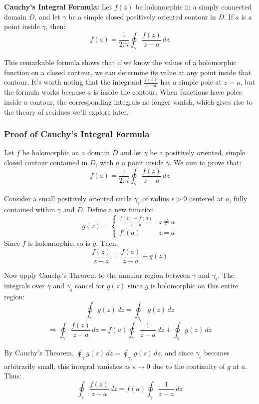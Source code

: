 \noindent \textbf{Cauchy's Integral Formula:} Let $f(z)$ be holomorphic in a simply connected domain $D$, and let $\gamma$ be a simple closed positively oriented contour in $D$. If $a$ is a point inside $\gamma$, then:
\[
f(a) = \frac{1}{2\pi i} \oint_{\gamma} \frac{f(z)}{z-a} \, dz
\]

\noindent This remarkable formula shows that if we know the values of a holomorphic function on a closed contour, we can determine its value at any point inside that contour. It's worth noting that the integrand $\frac{f(z)}{z-a}$ has a simple pole at $z = a$, but the formula works because $a$ is inside the contour. When functions have poles inside a contour, the corresponding integrals no longer vanish, which gives rise to the theory of residues we'll explore later.

\subsubsection*{Proof of Cauchy's Integral Formula}

\noindent Let \( f \) be holomorphic on a domain \( D \) and let \( \gamma \) be a positively oriented, simple closed contour contained in \( D \), with \( a \) a point inside \( \gamma \). We aim to prove that:
\[
f(a) = \frac{1}{2\pi i} \oint_\gamma \frac{f(z)}{z - a} \, dz
\]

\noindent Consider a small positively oriented circle \( \gamma_\epsilon \) of radius \( \epsilon > 0 \) centered at \( a \), fully contained within \( \gamma \) and \( D \). Define a new function
\[
g(z) = 
\begin{cases}
\frac{f(z) - f(a)}{z - a} & z \ne a \\
f'(a) & z = a
\end{cases}
\]
Since \( f \) is holomorphic, so is \( g \). Then,
\[
\frac{f(z)}{z - a} = \frac{f(a)}{z - a} + g(z)
\]

\noindent Now apply Cauchy's Theorem to the annular region between \( \gamma \) and \( \gamma_\epsilon \). The integrals over \( \gamma \) and \( \gamma_\epsilon \) cancel for \( g(z) \) since \( g \) is holomorphic on this entire region:
\[
\oint_\gamma g(z) \, dz = \oint_{\gamma_\epsilon} g(z) \, dz
\]
\[
\Rightarrow \oint_\gamma \frac{f(z)}{z - a} \, dz = f(a) \oint_\gamma \frac{1}{z - a} \, dz + \oint_\gamma g(z) \, dz
\]

\noindent By Cauchy's Theorem, \( \oint_\gamma g(z) \, dz = \oint_{\gamma_\epsilon} g(z) \, dz \), and since \( \gamma_\epsilon \) becomes arbitrarily small, this integral vanishes as \( \epsilon \to 0 \) due to the continuity of \( g \) at \( a \). Thus:
\[
\oint_\gamma \frac{f(z)}{z - a} \, dz = f(a) \oint_\gamma \frac{1}{z - a} \, dz
\]

